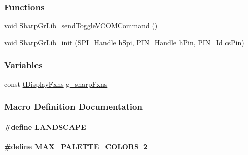 \subsubsection*{Functions}
\begin{DoxyCompactItemize}
\item 
void \hyperlink{_sharp_gr_lib_8h_a8d00c53411ec9635841332391647216b}{Sharp\+Gr\+Lib\+\_\+send\+Toggle\+V\+C\+O\+M\+Command} ()
\item 
void \hyperlink{_sharp_gr_lib_8h_ae490e4b018560b1794d46843e0733fbf}{Sharp\+Gr\+Lib\+\_\+init} (\hyperlink{_s_p_i_8h_a728806534c3c3e8675cfbfb7d8e36f13}{S\+P\+I\+\_\+\+Handle} h\+Spi, \hyperlink{_p_i_n_8h_afb2de52b054638f63c39df1f30a0d88d}{P\+I\+N\+\_\+\+Handle} h\+Pin, \hyperlink{_p_i_n_8h_a9ae8197f460bb76ea09a84f47d09921f}{P\+I\+N\+\_\+\+Id} cs\+Pin)
\end{DoxyCompactItemize}
\subsubsection*{Variables}
\begin{DoxyCompactItemize}
\item 
const \hyperlink{structt_display_fxns}{t\+Display\+Fxns} \hyperlink{_sharp_gr_lib_8h_a3b6b7ac6a1f7f6d8072279dbd22d3a50}{g\+\_\+sharp\+Fxns}
\end{DoxyCompactItemize}


\subsubsection{Macro Definition Documentation}
\paragraph[{L\+A\+N\+D\+S\+C\+A\+P\+E}]{\setlength{\rightskip}{0pt plus 5cm}\#define L\+A\+N\+D\+S\+C\+A\+P\+E}\label{_sharp_gr_lib_8h_a211dd160685be8a5a4f43be3fc3195a4}
\paragraph[{M\+A\+X\+\_\+\+P\+A\+L\+E\+T\+T\+E\+\_\+\+C\+O\+L\+O\+R\+S}]{\setlength{\rightskip}{0pt plus 5cm}\#define M\+A\+X\+\_\+\+P\+A\+L\+E\+T\+T\+E\+\_\+\+C\+O\+L\+O\+R\+S~2}\label{_sharp_gr_lib_8h_adffaead97b78252cbb751cb2dd65b3db}
